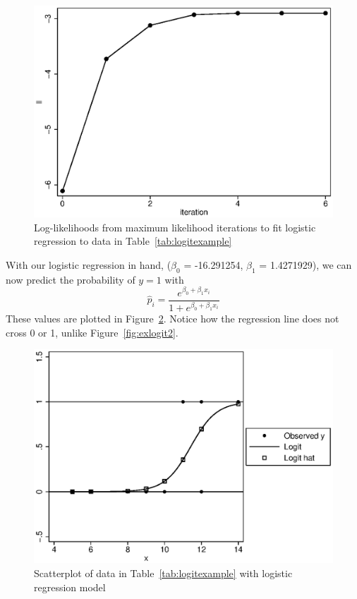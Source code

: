 \begin{figure}
   \centering
   \includegraphics[angle=0,
           width=.75\textwidth]{iteration.eps}
   \caption{Log-likelihoods from maximum likelihood iterations to fit logistic regression to data in Table~\ref{tab:logitexample}}
  \label{fig:iteration}
\end{figure}


With our logistic regression in hand, ($\beta_0$ = -16.291254, $\beta_1$ = 1.4271929), we can now predict the probability of $y=1$ with
\begin{equation}
\hat{p}_i = \frac{e^{\beta_0+\beta_1x_i}}{1+e^{\beta_0+\beta_1x_i}}
\end{equation}
These values are plotted in Figure~\ref{fig:exlogit3}. Notice how the regression line does not cross 0 or 1, unlike Figure~\ref{fig:exlogit2}.

\begin{figure}
   \centering
   \includegraphics[angle=0,
           width=.75\textwidth]{exlogit3.eps}
   \caption{Scatterplot of data in Table~\ref{tab:logitexample} with logistic regression model}
  \label{fig:exlogit3}
\end{figure}

